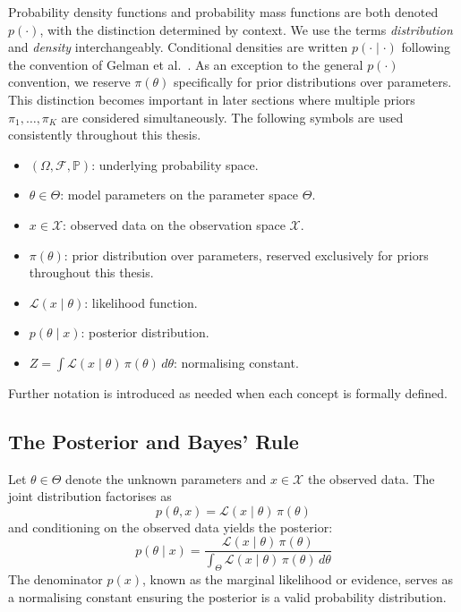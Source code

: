     Probability density functions and probability mass functions are both denoted $p(\cdot)$, with the distinction determined by context. We use the terms \textit{distribution} and \textit{density} interchangeably. Conditional densities are written $p(\cdot \mid \cdot)$ following the convention of Gelman et al.\ \citet{gelman2013}. As an exception to the general $p(\cdot)$ convention, we reserve $\pi(\theta)$ specifically for prior distributions over parameters. This distinction becomes important in later sections where multiple priors $\pi_1, \ldots, \pi_K$ are considered simultaneously. The following symbols are used consistently throughout this thesis.
    {\singlespacing
    \begin{itemize}
        \item $(\Omega, \mathcal{F}, \mathbb{P})$: underlying probability space.
        \item $\theta \in \Theta$: model parameters on the parameter space $\Theta$.
        \item $x \in \mathcal{X}$: observed data on the observation space $\mathcal{X}$.
        \item $\pi(\theta)$: prior distribution over parameters, reserved exclusively for priors throughout this thesis.
        \item $\mathcal{L}(x \mid \theta)$: likelihood function.
        \item $p(\theta \mid x)$: posterior distribution.
        \item $Z = \int \mathcal{L}(x \mid \theta)\, \pi(\theta)\, d\theta$: normalising constant.
    \end{itemize}
    }
    Further notation is introduced as needed when each concept is formally defined.

    \subsection{The Posterior and Bayes' Rule}

    Let $\theta \in \Theta$ denote the unknown parameters and $x \in \mathcal{X}$ the observed data. The joint distribution factorises as
    \begin{equation}
    p(\theta, x) = \mathcal{L}(x \mid \theta)\, \pi(\theta)
    \end{equation}
    and conditioning on the observed data yields the posterior:
    \begin{equation}
    p(\theta \mid x) = \frac{\mathcal{L}(x \mid \theta)\, \pi(\theta)}{\int_\Theta \mathcal{L}(x \mid \theta)\, \pi(\theta)\, d\theta}
    \end{equation}
    The denominator $p(x)$, known as the marginal likelihood or evidence, serves as a normalising constant ensuring the posterior is a valid probability distribution.

